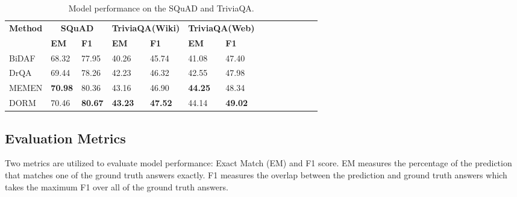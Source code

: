 \documentclass[sigconf]{acmart}
\begin{document}
 \begin{table}[t]
\centering
\label{my-label}
\begin{tabular}{lp{0.5cm}lp{1cm}lp{1cm}lp{1cm}lp{1cm}lp{1cm}lp{1cm}}
\hline
\multicolumn{1}{c}{\multirow{2}{*}{\textbf{Method}}} & \multicolumn{2}{c}{\textbf{SQuAD}} & \multicolumn{2}{l}{\textbf{TriviaQA(Wiki)}} & \multicolumn{2}{c}{\textbf{TriviaQA(Web)}} \\ \cline{2-7} 
\multicolumn{1}{c}{}                        & \textbf{EM}          & \textbf{F1}    & \textbf{EM}     & \textbf{F1}      & \textbf{EM}  & \textbf{F1}  \\ \hline
BiDAF                                       &  68.32 & 77.95       &         40.26           &   45.74                 & 41.08  & 47.40    \\
DrQA                                        & 69.44 & 78.26      &       42.23         &    46.32                & 42.55   &    47.98 \\
MEMEN                                       & \textbf{70.98} & 80.36       &           43.16         &  46.90                  &  \textbf{44.25}   &  48.34   \\
DORM                                        &  70.46 & \textbf{80.67}      &       \textbf{43.23}           &  \textbf{47.52}    &   44.14 &\textbf{49.02}   \\ 
\hline
\end{tabular}
  \vspace{2mm}
  \caption{Model performance on the SQuAD and TriviaQA. }       
\end{table}




\subsection{Evaluation Metrics}
Two metrics are utilized to evaluate model performance: Exact Match (EM) and F1 score. EM measures the percentage of the prediction that matches one of the ground truth answers exactly. F1 measures the overlap between the prediction and ground truth answers which takes the maximum F1 over all of the ground truth answers\cite{rnet}.
\end{document}
